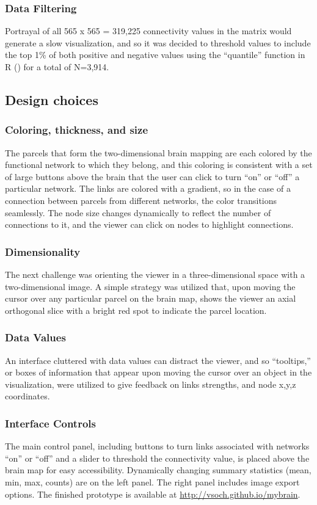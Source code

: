 \documentclass{report}
\begin{document}
\subsubsection{Data Filtering}
Portrayal of all 565 x 565 = 319,225 connectivity values in the matrix would generate a slow visualization, and so it was decided to threshold values to include the top 1\% of both positive and negative values using the ``quantile'' function in R (\cite{Hyndman1996-ho}) for a total of N=3,914.
  
\subsection{Design choices}
\subsubsection{Coloring, thickness, and size}
The parcels that form the two-dimensional brain mapping are each colored by the functional network to which they belong, and this coloring is consistent with a set of large buttons above the brain that the user can click to turn ``on'' or ``off'' a particular network.  The links are colored with a gradient, so in the case of a connection between parcels from different networks, the color transitions seamlessly.  The node size changes dynamically to reflect the number of connections to it, and the viewer can click on nodes to highlight connections.

\subsubsection{Dimensionality}
The next challenge was orienting the viewer in a three-dimensional space with a two-dimensional image.  A simple strategy was utilized that, upon moving the cursor over any particular parcel on the brain map, shows the viewer an axial orthogonal slice with a bright red spot to indicate the parcel location.

\subsubsection{Data Values}
An interface cluttered with data values can distract the viewer, and so ``tooltips,'' or boxes of information that appear upon moving the cursor over an object in the visualization, were utilized to give feedback on links strengths, and node x,y,z coordinates. 

\subsubsection{Interface Controls}
The main control panel, including buttons to turn links associated with networks ``on'' or ``off'' and a slider to threshold the connectivity value, is placed above the brain map for easy accessibility.  Dynamically changing summary statistics (mean, min, max, counts) are on the left panel.  The right panel includes image export options.  The finished prototype is available at \href{http://vsoch.github.io/mybrain}{http://vsoch.github.io/mybrain}.
\end{document}
